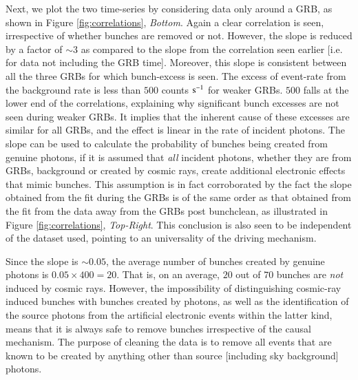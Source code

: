 Next, we plot the two time-series by considering data only around a GRB, as shown in Figure \ref{fig:correlations}, \emph{Bottom}. Again a clear correlation is seen, irrespective of whether bunches are removed or not. However, the slope is reduced by a factor of $\sim 3$ as compared to the slope from the correlation seen earlier [i.e. for data not including the GRB time]. Moreover, this slope is consistent between all the three GRBs for which bunch-excess is seen. The excess of event-rate from the background rate is less than $500$ counts ${\rm s^{-1}}$ for weaker GRBs. $500$ falls at the lower end of the correlations, explaining why significant bunch excesses are not seen during weaker GRBs. It implies that the inherent cause of these excesses are similar for all GRBs, and the effect is linear in the rate of incident photons. The slope can be used to calculate the probability of bunches being created from genuine photons, if it is assumed that \emph{all} incident photons, whether they are from GRBs, background or created by cosmic rays, create additional electronic effects that mimic bunches. This assumption is in fact corroborated by the fact the slope obtained from the fit during the GRBs is of the same order as that obtained from the fit from the data away from the GRBs post bunchclean, as illustrated in Figure \ref{fig:correlations}, \emph{Top-Right}. This conclusion is also seen to be independent of the dataset used, pointing to an universality of the driving mechanism.

Since the slope is $\sim 0.05$, the average number of bunches created by genuine photons is $0.05 \times 400 = 20$. That is, on an average, $20$ out of $70$ bunches are \emph{not} induced by cosmic rays. However, the impossibility of distinguishing cosmic-ray induced bunches with bunches created by photons, as well as the identification of the source photons from the artificial electronic events within the latter kind, means that it is always safe to remove bunches irrespective of the causal mechanism. The purpose of cleaning the data is to remove all events that are known to be created by anything other than source [including sky background] photons.

